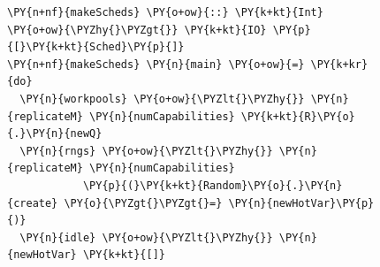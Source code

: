 \captionsetup[figure]{format=normal}
\begin{figure}[t]
  \centering



\begin{Verbatim}[commandchars=\\\{\}]
\PY{n+nf}{makeScheds} \PY{o+ow}{::} \PY{k+kt}{Int} \PY{o+ow}{\PYZhy{}\PYZgt{}} \PY{k+kt}{IO} \PY{p}{[}\PY{k+kt}{Sched}\PY{p}{]}
\PY{n+nf}{makeScheds} \PY{n}{main} \PY{o+ow}{=} \PY{k+kr}{do}
  \PY{n}{workpools} \PY{o+ow}{\PYZlt{}\PYZhy{}} \PY{n}{replicateM} \PY{n}{numCapabilities} \PY{k+kt}{R}\PY{o}{.}\PY{n}{newQ}
  \PY{n}{rngs} \PY{o+ow}{\PYZlt{}\PYZhy{}} \PY{n}{replicateM} \PY{n}{numCapabilities}
            \PY{p}{(}\PY{k+kt}{Random}\PY{o}{.}\PY{n}{create} \PY{o}{\PYZgt{}\PYZgt{}=} \PY{n}{newHotVar}\PY{p}{)}
  \PY{n}{idle} \PY{o+ow}{\PYZlt{}\PYZhy{}} \PY{n}{newHotVar} \PY{k+kt}{[]}


\end{Verbatim}
\end{figure}
